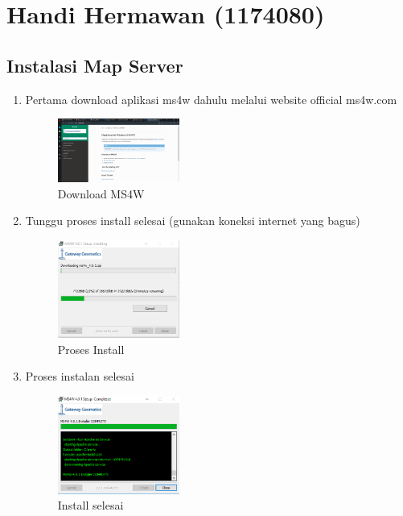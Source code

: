 \section{Handi Hermawan (1174080)}
\subsection{Instalasi Map Server}
\begin{enumerate}
    \item Pertama download aplikasi ms4w dahulu melalui website official ms4w.com
    \hfill\break
    \begin{figure}[H]
		\includegraphics[width=4cm]{figures/tugas4/1174080/download.PNG}
		\centering
		\caption{Download MS4W}
    \end{figure}
    \hfill\break

    \item Tunggu proses install selesai (gunakan koneksi internet yang bagus)
    \hfill\break
    \begin{figure}[H]
		\includegraphics[width=4cm]{figures/tugas4/1174080/install_MS4W.PNG}
		\centering
		\caption{Proses Install}
    \end{figure}
    \hfill\break
    \item Proses instalan selesai
    \hfill\break
    \begin{figure}[H]
		\includegraphics[width=4cm]{figures/tugas4/1174080/Selesai.PNG}
		\centering
		\caption{Install selesai}
    \end{figure}
    \hfill\break

\end{enumerate}

